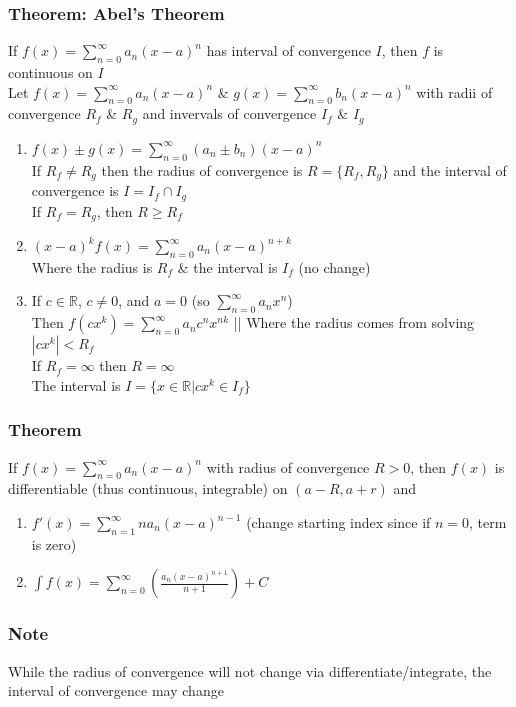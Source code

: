 \documentclass[12pt, letterpaper]{article}
\begin{document}
\subsubsection{Theorem: Abel's Theorem}
If $f(x) = \displaystyle\sum_{n=0}^{\infty}a_n(x-a)^n$ has interval of convergence $I$, then $f$ is continuous on $I$ \\
Let $f(x) = \displaystyle\sum_{n=0}^{\infty}a_n(x-a)^n$ \& $g(x) = \displaystyle\sum_{n=0}^{\infty}b_n(x-a)^n$ with radii of convergence $R_f$ \& $R_g$ and invervals of convergence $I_f$ \& $I_g$
\begin{enumerate}
    \item $f(x)\pm g(x) = \displaystyle\sum_{n=0}^{\infty}(a_n\pm b_n)(x-a)^n$ \\
    If $R_f\neq R_g$ then the radius of convergence is $R=\{R_f, R_g\}$ and the interval of convergence is $I = I_f\cap I_g$ \\
    If $R_f = R_g$, then $R\geq R_f$
    \item $(x-a)^kf(x) = \displaystyle\sum_{n=0}^{\infty}a_n(x-a)^{n+k}$ \\
    Where the radius is $R_f$ \& the interval is $I_f$ (no change)
    \item If $c\in\mathbb{R}$, $c\neq0$, and $a=0$ (so $\displaystyle\sum_{n=0}^{\infty}a_nx^n$) \\
    Then $f(cx^k) = \displaystyle\sum_{n=0}^{\infty}a_nc^nx^{nk}$ ||
    Where the radius comes from solving $|cx^k|<R_f$ \\
    If $R_f=\infty$ then $R=\infty$ \\
    The interval is $I = \{x\in\mathbb{R} | cx^k\in I_f\}$
\end{enumerate}
\subsubsection{Theorem}
If $f(x) = \displaystyle\sum_{n=0}^{\infty}a_n(x-a)^n$ with radius of convergence $R>0$, then $f(x)$ is differentiable (thus continuous, integrable) on $(a-R, a+r)$ and 
\begin{enumerate}
    \item $f'(x) = \displaystyle\sum_{n=1}^{\infty}na_n(x-a)^{n-1}$ (change starting index since if $n=0$, term is zero)
    \item $\displaystyle\int f(x) = \sum_{n=0}^{\infty}(\frac{a_n(x-a)^{n+1}}{n+1})+C$
\end{enumerate}
\subsubsection*{Note}
While the radius of convergence will not change via differentiate/integrate, the interval of convergence may change
\end{document}

